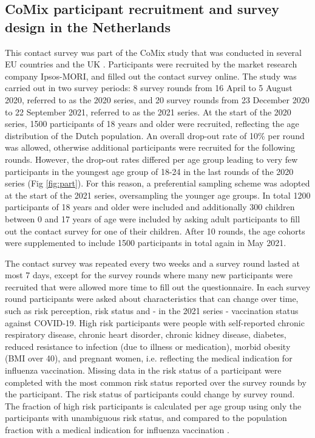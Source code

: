 \documentclass[fleqn,10pt]{wlscirep}
\begin{document}
\subsection*{CoMix participant recruitment and survey design in the Netherlands}

This contact survey was part of the CoMix study that was conducted in several EU countries and the UK \cite{Verelst_2021}. Participants were recruited by the market research company Ipsos-MORI, and filled out the contact survey online. The study was carried out in two survey periods: 8 survey rounds from 16 April to 5 August 2020, referred to as the 2020 series, and 20 survey rounds from 23 December 2020 to 22 September 2021, referred to as the 2021 series. At the start of the 2020 series, 1500 participants of 18 years and older were recruited, reflecting the age distribution of the Dutch population. An overall drop-out rate of 10\% per round was allowed, otherwise additional participants were recruited for the following rounds. However, the drop-out rates differed per age group leading to very few participants in the youngest age group of 18-24 in the last rounds of the 2020 series (Fig \ref{fig:part}). For this reason, a preferential sampling scheme was adopted at the start of the 2021 series, oversampling the younger age groups. In total 1200 participants of 18 years and older were included and additionally 300 children between 0 and 17 years of age were included by asking adult participants to fill out the contact survey for one of their children. After 10 rounds, the age cohorts were supplemented to include 1500 participants in total again in May 2021.

The contact survey was repeated every two weeks and a survey round lasted at most 7 days, except for the survey rounds where many new participants were recruited that were allowed more time to fill out the questionnaire. In each survey round participants were asked about characteristics that can change over time, such as risk perception, risk status and - in the 2021 series - vaccination status against COVID-19. High risk participants were people with self-reported chronic respiratory disease, chronic heart disorder, chronic kidney disease, diabetes, reduced resistance to infection (due to illness or medication), morbid obesity (BMI over 40), and pregnant women, i.e. reflecting the medical indication for influenza vaccination. Missing data in the risk status of a participant were completed with the most common risk status reported over the survey rounds by the participant. The risk status of participants could change by survey round. The fraction of high risk participants is calculated per age group using only the participants with unambiguous risk status, and compared to the population fraction with a medical indication for influenza vaccination \cite{Nivel_2021}. 
\end{document}
